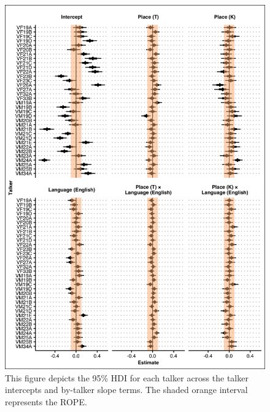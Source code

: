 \begin{figure}[htbp]
  \begin{center}
  \includegraphics[width=0.9\linewidth]{figures/ch4_grpparvar_5in.png} 
  \caption{This figure depicts the 95\% HDI for each talker across the talker intercepts and by-talker slope terms. The shaded orange interval represents the ROPE.}
  \label{ch4:fig:grpparvar}
  \end{center}
\end{figure}

